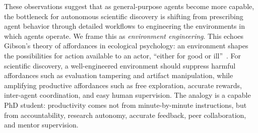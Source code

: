 \documentclass{article} %
\begin{document}
   These observations suggest that as general-purpose agents become more capable, the bottleneck for autonomous scientific discovery is shifting from prescribing agent behavior through detailed workflows to engineering the environments in which agents operate.
   We frame this as \emph{environment engineering}.
   This 
   echoes Gibson's theory of affordances in ecological psychology: an environment shapes the possibilities for action available to an actor, ``either for good or ill''~\citep{gibson1979ecological}.
   For scientific discovery, a well-engineered environment should suppress harmful affordances such as evaluation tampering and artifact manipulation, while amplifying productive affordances such as free exploration, accurate rewards, inter-agent coordination, and easy human supervision.
   The analogy is a capable PhD student: productivity comes not from minute-by-minute instructions, but from accountability, research autonomy, accurate feedback, peer collaboration, and mentor supervision.
   
\end{document}
